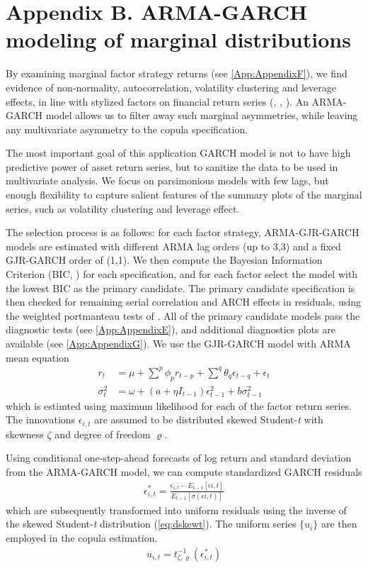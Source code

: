\newpage
\section{Appendix B. ARMA-GARCH modeling of marginal distributions} \label{App:AppendixB}

By examining marginal factor strategy returns (see \autoref{App:AppendixF}), we find evidence of non-normality, autocorrelation, volatility clustering and leverage effects, in line with stylized factors on financial return series (\textcite{Bollerslev1986}, \textcite{Black1976}, \textcite{glosten1993relation}). An ARMA-GARCH model allows us to filter away such marginal asymmetries, while leaving any multivariate asymmetry to the copula specification. 

The most important goal of this application GARCH model is not to have high predictive power of asset return series, but to sanitize the data to be used in multivariate analysis. We focus on parsimonious models with few lags, but enough flexibility to capture salient features of the summary plots of the marginal series, such as volatility clustering and leverage effect.

The selection process is as follows: for each factor strategy, ARMA-GJR-GARCH models are estimated with different ARMA lag orders (up to 3,3) and a fixed GJR-GARCH order of (1,1). We then compute the Bayesian Information Criterion (BIC, \textcite{Schwarz1978}) for each specification, and for each factor select the model with the lowest BIC as the primary candidate. The primary candidate specification is then checked for remaining serial correlation and ARCH effects in residuals, using the weighted portmanteau tests of \textcite{FisherGallagher2012}. All of the primary candidate models pass the diagnostic tests (see \autoref{App:AppendixE}), and additional diagnostics plots are available (see \autoref{App:AppendixG}). We use the GJR-GARCH model with ARMA mean equation
\begin{align}
    r_t &= \mu + \sum^p \phi_p r_{t-p} + \sum^q \theta_q \epsilon_{t-q} + \epsilon_{t}  \\
    \sigma_{t}^2 &= \omega + (a + \eta I_{t-1}) \epsilon_{t-1}^2 + b \sigma^2_{t-1}
\end{align}
which is estimted using maximum likelihood for each of the factor return series. The innovations $\epsilon_{i,t}$ are assumed to be distributed skewed Student-\textit{t} with skewness $\zeta$ and degree of freedom $\varrho$.

Using conditional one-step-ahead forecasts of log return and standard deviation from the ARMA-GARCH model, we can compute standardized GARCH residuals
\begin{align}
    \epsilon^*_{i,t} = \frac{\epsilon_{i,t} - E_{t-1}[\epsilon{i,t}]}{E_{t-1}[\sigma(\epsilon{i,t})]}
\end{align}
which are subsequently transformed into uniform residuals using the inverse of the skewed Student-\textit{t} distribution (\autoref{eq:dskewt}). The uniform series $\{u_i\}$ are then employed in the copula estimation.
\begin{align}
    u_{i,t} = t^{-1}_{\zeta, \varrho}(\epsilon^*_{i,t})
\end{align}

